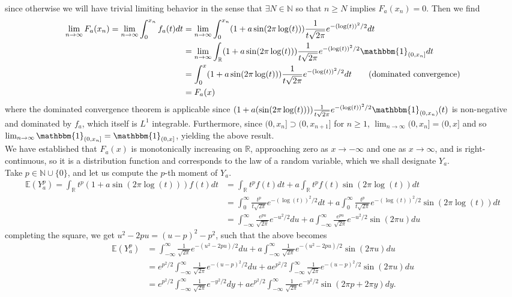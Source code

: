 \documentclass[10pt]{article}
\newcommand{\E}{\mathbb{E}}
\newcommand{\mbb}[1]{\mathbb{#1}}
\newcommand{\1}[1]{\mathbbm{1}_{#1}}
\begin{document}
    since otherwise we will have trivial limiting behavior in the sense that $\exists N\in\mbb{N}$ so that $n\geq N$ implies $F_a(x_n)=0$. Then we find
    \begin{align*}
        \lim_{n\rightarrow\infty}F_a(x_n)=\lim_{n\rightarrow\infty}\int_0^{x_n}f_a(t)dt&=\lim_{n\rightarrow\infty}\int_0^{x_n}(1+a\sin(2\pi\log(t)))\frac{1}{t\sqrt{2\pi}}e^{-(\log(t))^2/2}dt\\
        &=\lim_{n\rightarrow\infty}\int_{\mbb{R}}(1+a\sin(2\pi\log(t)))\frac{1}{t\sqrt{2\pi}}e^{-(\log(t))^2/2}\1{(0,x_n]}dt\\
        &=\int_0^x(1+a\sin(2\pi\log(t)))\frac{1}{t\sqrt{2\pi}}e^{-(\log(t))^2/2}dt\tag{dominated convergence}\\
        &=F_a(x)
    \end{align*} 
    where the dominated convergence theorem is applicable since $(1+a(\sin(2\pi\log(t))))\tfrac{1}{t\sqrt{2\pi}}e^{-(\log(t))^2/2}\1{(0,x_n)}(t)$ is non-negative and dominated by $f_a$, which itself is $L^1$ integrable. Furthermore, since $(0,x_n]\supset (0,x_{n+1}]$ for $n\geq 1$, $\lim_{n\rightarrow\infty}(0,x_n]=(0,x]$ and so $\lim_{n\rightarrow\infty}\1{(0,x_n]}=\1{(0,x]}$, yielding the above result.
    \\[5pt]
    We have established that $F_a(x)$ is monotonically increasing on $\mbb{R}$, approaching zero as $x\rightarrow-\infty$ and one as $x\rightarrow\infty$, and is right-continuous, so it is
    a distribution function and corresponds to the law of a random variable, which we shall designate $Y_a$.\\[5pt]
    Take $p\in\mbb{N}\cup\{0\}$, and let us compute the $p$-th moment of $Y_a$.
    \begin{align*}
        \E{(Y_a^p)}=\int_\mbb{R}t^p(1+a\sin(2\pi\log(t)))f(t)dt&=\int_\mbb{R}t^pf(t)dt+a\int_\mbb{R}t^pf(t)\sin(2\pi\log(t))dt\\
        &=\int_0^\infty\frac{t^p}{t\sqrt{2\pi}}e^{-(\log(t))^2/2}dt+a\int_0^\infty\frac{t^p}{t\sqrt{2\pi}}e^{-(\log(t))^2/2}\sin(2\pi\log(t))dt\\
        &=\int_{-\infty}^\infty \frac{e^{pu}}{\sqrt{2\pi}}e^{-u^2/2}du+a\int_{-\infty}^\infty\frac{e^{pu}}{\sqrt{2\pi}}e^{-u^2/2}\sin(2\pi u)du\tag{setting $u=\log(t)$}
    \end{align*}
    completing the square, we get $u^2-2pu=(u-p)^2-p^2$, such that the above becomes
    \begin{align*}
        \E{(Y_a^p)}&=\int_{-\infty}^\infty \frac{1}{\sqrt{2\pi}}e^{-(u^2-2pu)/2}du+a\int_{-\infty}^\infty\frac{1}{\sqrt{2\pi}}e^{-(u^2-2pu)/2}\sin(2\pi u)du\\
        &=e^{p^2/2}\int_{-\infty}^\infty \frac{1}{\sqrt{2\pi}}e^{-(u-p)^2/2}du+ae^{p^2/2}\int_{-\infty}^\infty\frac{1}{\sqrt{2\pi}}e^{-(u-p)^2/2}\sin(2\pi u)du\\
        &=e^{p^2/2}\int_{-\infty}^\infty \frac{1}{\sqrt{2\pi}}e^{-y^2/2}dy+ae^{p^2/2}\int_{-\infty}^\infty\frac{1}{\sqrt{2\pi}}e^{-y^2/2}\sin(2\pi p+2\pi y)dy.
    \end{align*}
\end{document}
